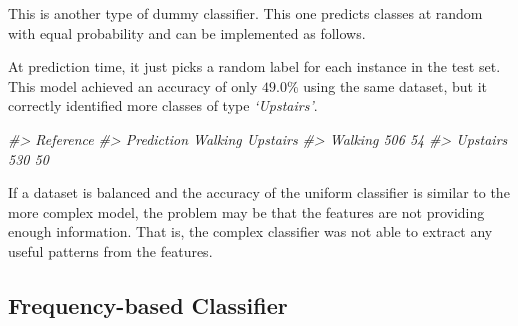\documentclass[
  11pt,
]{krantz}
\newenvironment{Shaded}{\begin{snugshade}}{\end{snugshade}}
\newcommand{\AttributeTok}[1]{\textcolor[rgb]{0.61,0.61,0.61}{#1}}
\newcommand{\CommentTok}[1]{\textcolor[rgb]{0.37,0.37,0.37}{\textit{#1}}}
\newcommand{\ControlFlowTok}[1]{\textcolor[rgb]{0.27,0.27,0.27}{\textbf{#1}}}
\newcommand{\FunctionTok}[1]{\textcolor[rgb]{0,0,0}{#1}}
\newcommand{\NormalTok}[1]{#1}
\newcommand{\OtherTok}[1]{\textcolor[rgb]{0.37,0.37,0.37}{#1}}
\newcommand{\SpecialCharTok}[1]{\textcolor[rgb]{0,0,0}{#1}}
\begin{document}
This is another type of dummy classifier. This one predicts classes at random with equal probability and can be implemented as follows.

\begin{Shaded}
\end{Shaded}

At prediction time, it just picks a random label for each instance in the test set. This model achieved an accuracy of only \(49.0\%\) using the same dataset, but it correctly identified more classes of type \emph{`Upstairs'}.

\begin{Shaded}
\begin{Highlighting}[]
\CommentTok{\#\textgreater{}           Reference}
\CommentTok{\#\textgreater{} Prediction Walking Upstairs}
\CommentTok{\#\textgreater{}   Walking      506       54}
\CommentTok{\#\textgreater{}   Upstairs     530       50}
\end{Highlighting}
\end{Shaded}

If a dataset is balanced and the accuracy of the uniform classifier is similar to the more complex model, the problem may be that the features are not providing enough information. That is, the complex classifier was not able to extract any useful patterns from the features.

\hypertarget{frequency-based-classifier}{%
\subsection{Frequency-based Classifier}\label{frequency-based-classifier}}
\end{document}

